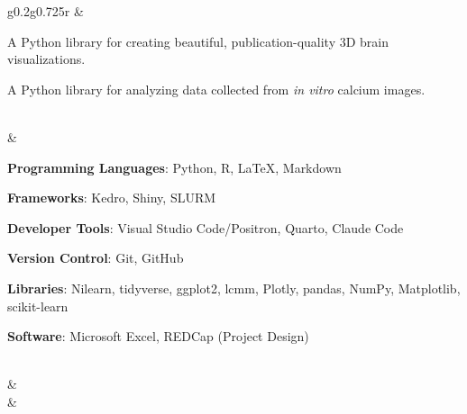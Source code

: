 \documentclass{my_cv}
\begin{document}
\begin{longtable}[l]{g{0.2\textwidth}g{0.725\textwidth}r}
	 &
		\begin{description}
			\tightlist
			\item[\href{https://teanijarv.github.io/yabplot/}{YabPlot}] {
				A Python library for creating beautiful, publication-quality 3D brain visualizations.
			}
			\item[\href{https://ajbarrows.github.io/vitrocal/}{\textbf{VitroCal}}]{
				A Python library for analyzing data collected from \textit{in vitro} calcium images.
			}
		\end{description}\\
		&  
		\begin{description}
			\tightlist
			\item\textbf{Programming Languages}{: Python, R, \LaTeX, Markdown}
			\item\textbf{Frameworks}{: Kedro, Shiny, SLURM} 
			\item\textbf{Developer Tools}{: Visual Studio Code/Positron, Quarto, Claude Code} 
			\item\textbf{Version Control}{: Git, GitHub} 
			\item\textbf{Libraries}{: Nilearn, tidyverse, ggplot2, lcmm, Plotly, pandas, NumPy, Matplotlib, scikit-learn} 
			\item\textbf{Software}{: Microsoft Excel, REDCap (Project Design)}
		\end{description}\\
		& \\
		& \\
\end{longtable}



% 
\end{document}
